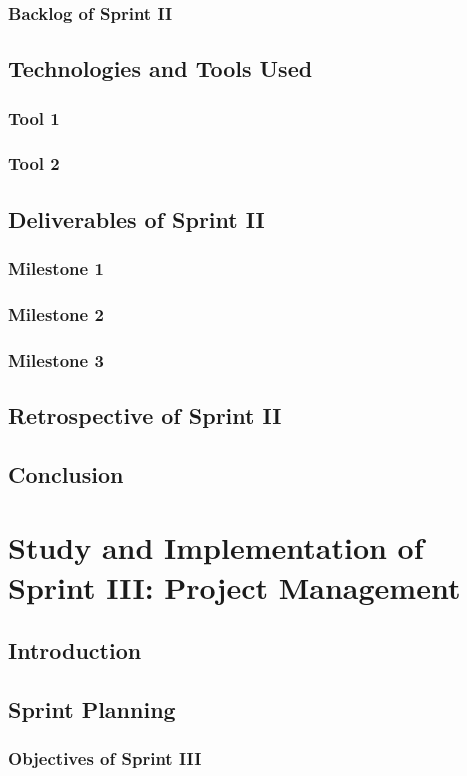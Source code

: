 \documentclass[a4paper,12pt]{report}
\begin{document}
\subsection{Backlog of Sprint II}
\section{Technologies and Tools Used}
\subsection{Tool 1}
\subsection{Tool 2}
\section{Deliverables of Sprint II}
\subsection{Milestone 1}
\subsection{Milestone 2}
\subsection{Milestone 3}
\section{Retrospective of Sprint II}
\section{Conclusion}

\chapter[Sprint III]{Study and Implementation of Sprint III: Project Management}

\minitoc
\section{Introduction}
\section{Sprint Planning}
\subsection{Objectives of Sprint III}
\end{document}
